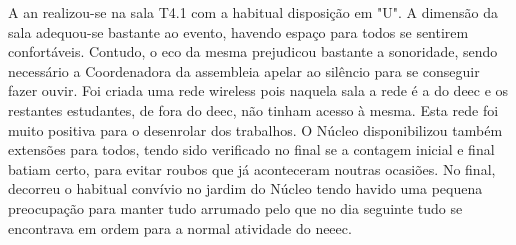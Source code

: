 A \acrshort{an} realizou-se na sala T4.1 com a habitual disposição em "U". A dimensão da sala adequou-se bastante ao evento, havendo espaço para todos se sentirem confortáveis. Contudo, o eco da mesma prejudicou bastante a sonoridade, sendo necessário a Coordenadora da assembleia apelar ao silêncio para se conseguir fazer ouvir. Foi criada uma rede wireless pois naquela sala a rede é a do \acrshort{deec} e os restantes estudantes, de fora do \acrshort{deec}, não tinham acesso à mesma. Esta rede foi muito positiva para o desenrolar dos trabalhos. O Núcleo disponibilizou também extensões para todos, tendo sido verificado no final se a contagem inicial e final batiam certo, para evitar roubos que já aconteceram noutras ocasiões. No final, decorreu o habitual convívio no jardim do Núcleo tendo havido uma pequena preocupação para manter tudo arrumado pelo que no dia seguinte tudo se encontrava em ordem para a normal atividade do \acrshort{neeec}. 
